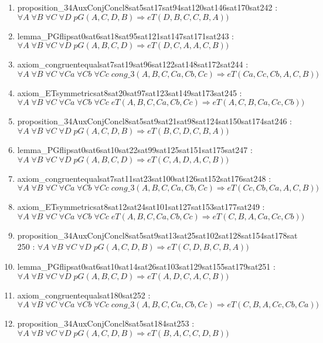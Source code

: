 \documentclass{article}
\begin{document}
\begin{enumerate}
\item proposition\_34AuxConjConcl8sat5sat17sat94sat120sat146sat170sat242 : $\forall A\;\forall B\;\forall C\;\forall D\;pG(A, C, D, B) \Rightarrow eT(D, B, C, C, B, A))$
\item lemma\_PGflipsat0sat6sat18sat95sat121sat147sat171sat243 : $\forall A\;\forall B\;\forall C\;\forall D\;pG(A, B, C, D) \Rightarrow eT(D, C, A, A, C, B))$
\item axiom\_congruentequalsat7sat19sat96sat122sat148sat172sat244 : $\forall A\;\forall B\;\forall C\;\forall Ca\;\forall Cb\;\forall Cc\;cong\_3(A, B, C, Ca, Cb, Cc) \Rightarrow eT(Ca, Cc, Cb, A, C, B))$
\item axiom\_ETsymmetricsat8sat20sat97sat123sat149sat173sat245 : $\forall A\;\forall B\;\forall C\;\forall Ca\;\forall Cb\;\forall Cc\;eT(A, B, C, Ca, Cb, Cc) \Rightarrow eT(A, C, B, Ca, Cc, Cb))$
\item proposition\_34AuxConjConcl8sat5sat9sat21sat98sat124sat150sat174sat246 : $\forall A\;\forall B\;\forall C\;\forall D\;pG(A, C, D, B) \Rightarrow eT(B, C, D, C, B, A))$
\item lemma\_PGflipsat0sat6sat10sat22sat99sat125sat151sat175sat247 : $\forall A\;\forall B\;\forall C\;\forall D\;pG(A, B, C, D) \Rightarrow eT(C, A, D, A, C, B))$
\item axiom\_congruentequalsat7sat11sat23sat100sat126sat152sat176sat248 : $\forall A\;\forall B\;\forall C\;\forall Ca\;\forall Cb\;\forall Cc\;cong\_3(A, B, C, Ca, Cb, Cc) \Rightarrow eT(Cc, Cb, Ca, A, C, B))$
\item axiom\_ETsymmetricsat8sat12sat24sat101sat127sat153sat177sat249 : $\forall A\;\forall B\;\forall C\;\forall Ca\;\forall Cb\;\forall Cc\;eT(A, B, C, Ca, Cb, Cc) \Rightarrow eT(C, B, A, Ca, Cc, Cb))$
\item proposition\_34AuxConjConcl8sat5sat9sat13sat25sat102sat128sat154sat178sat250 : $\forall A\;\forall B\;\forall C\;\forall D\;pG(A, C, D, B) \Rightarrow eT(C, D, B, C, B, A))$
\item lemma\_PGflipsat0sat6sat10sat14sat26sat103sat129sat155sat179sat251 : $\forall A\;\forall B\;\forall C\;\forall D\;pG(A, B, C, D) \Rightarrow eT(A, D, C, A, C, B))$
\item axiom\_congruentequalsat180sat252 : $\forall A\;\forall B\;\forall C\;\forall Ca\;\forall Cb\;\forall Cc\;cong\_3(A, B, C, Ca, Cb, Cc) \Rightarrow eT(C, B, A, Cc, Cb, Ca))$
\item proposition\_34AuxConjConcl8sat5sat184sat253 : $\forall A\;\forall B\;\forall C\;\forall D\;pG(A, C, D, B) \Rightarrow eT(B, A, C, C, D, B))$

\end{enumerate}
\end{document}
